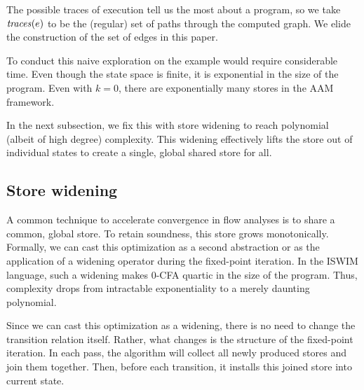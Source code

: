 \documentclass[preprint,onecolumn,9pt]{sigplanconf} %
\newcommand{\naive}{naive}
\begin{document}
The possible traces of execution tell us the most about a program, so
we take $\mathit{traces}(e)$ to be the (regular) set of paths through the
computed graph. We elide the construction of the set of edges in this paper.

To conduct this \naive{} exploration on the \Church{} example would require
considerable time.  Even though the state space is finite, it is exponential in
the size of the program.  Even with $k = 0$, there are exponentially many
stores in the AAM framework.

In the next subsection, we fix this with store widening to reach polynomial
(albeit of high degree) complexity.
%
This widening effectively lifts the store out of individual states to create
a single, global shared store for all.


\subsection{Store widening}
\label{sec:storewiden}

A common technique to accelerate convergence in flow analyses is to share a
common, global store.
%
To retain soundness, this store grows monotonically.
%
Formally, we can cast this optimization as a second abstraction or as the
application of a widening operator during the fixed-point iteration.
%
In the ISWIM language, such a widening makes 0-CFA quartic in the size of the
program.
%
Thus, complexity drops from intractable exponentiality to a merely
daunting polynomial.

Since we can cast this optimization as a widening, there is no need to change
the transition relation itself.
%
Rather, what changes is the structure of the fixed-point iteration.
%
In each pass, the algorithm will collect all newly produced stores and join
them together.
%
Then, before each transition, it installs this joined store into current
state.
\end{document}
